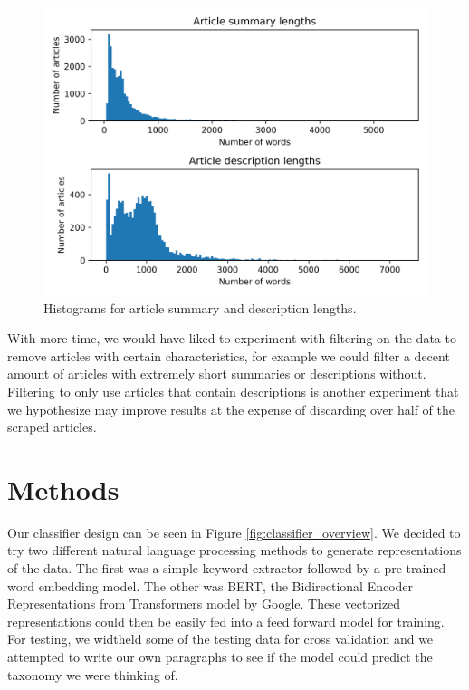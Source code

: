 \documentclass[10pt,twocolumn,letterpaper]{article}
\begin{document}
\begin{figure}
  \includegraphics[width=\linewidth]{article_lengths.png}
  \caption{Histograms for article summary and description lengths.}
  \label{fig:article_lengths}
\end{figure}

With more time, we would have liked to experiment with filtering on the data to remove articles with certain characteristics, for example we could filter a decent amount of articles with extremely short summaries or descriptions without. Filtering to only use articles that contain descriptions is another experiment that we hypothesize may improve results at the expense of discarding over half of the scraped articles. 

\section{Methods}
\label{section:methods}

Our classifier design can be seen in Figure \ref{fig:classifier_overview}. We decided to try two different natural language processing methods to generate representations of the data. The first was a simple keyword extractor followed by a pre-trained word embedding model. The other was BERT, the Bidirectional Encoder Representations from Transformers model by Google. These vectorized representations could then be easily fed into a feed forward model for training. For testing, we widtheld some of the testing data for cross validation and we attempted to write our own paragraphs to see if the model could predict the taxonomy we were thinking of. 
\end{document}
